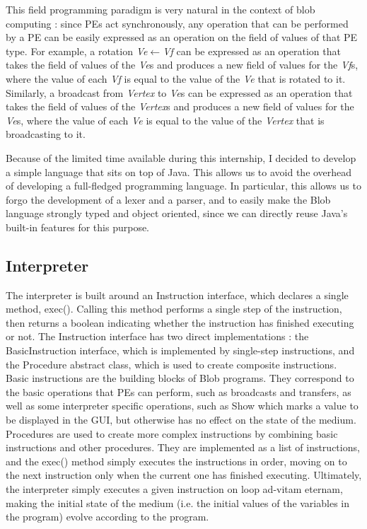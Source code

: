 \documentclass[11pt,a4paper]{report}
\begin{document}
This field programming paradigm is very natural in the context of blob computing : since PEs act synchronously, any operation that can be performed by a PE can be easily expressed as an operation on the field of values of that PE type. For example, a rotation \textit{Ve}$\leftarrow$\textit{Vf} can be expressed as an operation that takes the field of values of the \textit{Ve}s and produces a new field of values for the \textit{Vf}s, where the value of each \textit{Vf} is equal to the value of the \textit{Ve} that is rotated to it. Similarly, a broadcast from \textit{Vertex} to \textit{Ve}s can be expressed as an operation that takes the field of values of the \textit{Vertex}s and produces a new field of values for the \textit{Ve}s, where the value of each \textit{Ve} is equal to the value of the \textit{Vertex} that is broadcasting to it.

Because of the limited time available during this internship, I decided to develop a simple language that sits on top of Java. This allows us to avoid the overhead of developing a full-fledged programming language. In particular, this allows us to forgo the development of a lexer and a parser, and to easily make the Blob language strongly typed and object oriented, since we can directly reuse Java's built-in features for this purpose.

\subsection{Interpreter}

The interpreter is built around an Instruction interface, which declares a single method, exec(). Calling this method performs a single step of the instruction, then returns a boolean indicating whether the instruction has finished executing or not. The Instruction interface has two direct implementations : the BasicInstruction interface, which is implemented by single-step instructions, and the Procedure abstract class, which is used to create composite instructions. Basic instructions are the building blocks of Blob programs. They correspond to the basic operations that PEs can perform, such as broadcasts and transfers, as well as some interpreter specific operations, such as Show which marks a value to be displayed in the GUI, but otherwise has no effect on the state of the medium. Procedures are used to create more complex instructions by combining basic instructions and other procedures. They are implemented as a list of instructions, and the exec() method simply executes the instructions in order, moving on to the next instruction only when the current one has finished executing. Ultimately, the interpreter simply executes a given instruction on loop ad-vitam eternam, making the initial state of the medium (i.e. the initial values of the variables in the program) evolve according to the program. 
\end{document}
